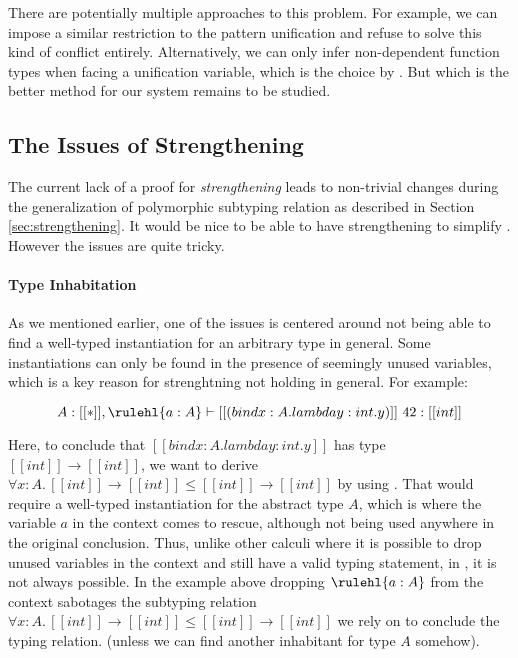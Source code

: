 There are potentially multiple approaches to this problem. For example, we can
impose a similar restriction to the pattern unification and refuse to solve
this kind of conflict entirely. Alternatively, we can only infer non-dependent function types when
facing a unification variable, which is the choice by \citet{dh}. But which is
the better method for our system remains to be studied.

\subsection{The Issues of Strengthening}
\label{sec:habitability}

The current lack of a proof for \emph{strengthening} leads to non-trivial
changes during the generalization of polymorphic subtyping relation as
described in Section \ref{sec:strengthening}. It would be nice to be able to
have strengthening to simplify \name. However the issues are
quite tricky.

\paragraph{Type Inhabitation}
As we mentioned earlier, one of the issues is centered around not being able to find a
well-typed instantiation for an arbitrary type in general. Some instantiations
can only be found in the presence of seemingly unused variables,
which is a key reason for strenghtning not holding in general. For example:

\begin{equation*}
    A : [[*]], \rulehl{a : A} \vdash [[(bind x : A. lambda y : int. y)]]~42 : [[int]]
\end{equation*}

Here, to conclude that $[[bind x : A. lambda y : int. y]]$ has type $[[int]] \rightarrow [[int]]$,
we want to derive $\forall x : A.\, [[int]] \rightarrow [[int]] \le [[int]] \rightarrow [[int]]$ by
using . That would require a well-typed instantiation
for the abstract type $A$, which is where the variable $a$ in the context
comes to rescue, although not being used anywhere in the original conclusion.
Thus, unlike other calculi where it is possible to drop unused variables in the context
and still have a valid typing statement, in \name, it is not always possible. In the example
above dropping $\rulehl{a : A}$ from the context sabotages the subtyping relation
$\forall x : A.\, [[int]] \rightarrow [[int]] \le [[int]] \rightarrow [[int]]$
we rely on to conclude the typing relation.
(unless we can find another inhabitant for type $A$ somehow).

